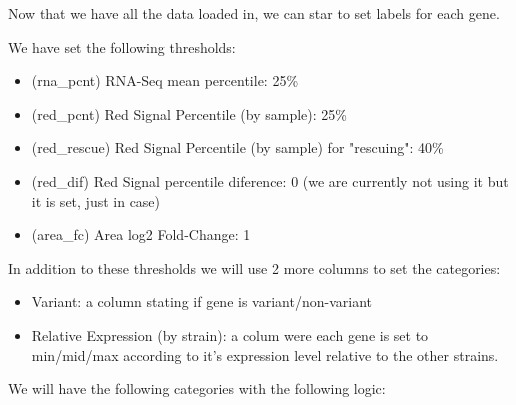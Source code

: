 \documentclass[11pt]{article}
\begin{document}
Now that we have all the data loaded in, we can star to set labels for each gene.

We have set the following thresholds:
\begin{itemize}
\item (rna\_pcnt) RNA-Seq mean percentile: 25\%
\item (red\_pcnt) Red Signal Percentile (by sample): 25\%
\item (red\_rescue) Red Signal Percentile (by sample) for "rescuing": 40\%
\item (red\_dif) Red Signal percentile diference: 0 (we are currently not using it but it is set, just in case)
\item (area\_fc) Area log2 Fold-Change: 1
\end{itemize}

In addition to these thresholds we will use 2 more columns to set the categories:
\begin{itemize}
\item Variant: a column stating if gene is variant/non-variant
\item Relative Expression (by strain): a colum were each gene is set to min/mid/max according to it's expression level relative to the other strains.
\end{itemize}

We will have the following categories with the following logic:
\end{document}
